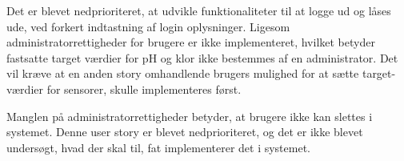 Det er blevet nedprioriteret, at udvikle funktionaliteter til at logge ud og låses ude, ved forkert indtastning af login oplysninger. Ligesom administratorrettigheder for brugere er ikke implementeret, hvilket betyder fastsatte target værdier for pH og klor ikke bestemmes af en administrator. Det vil kræve at en anden story omhandlende brugers mulighed for at sætte target-værdier for sensorer, skulle implementeres først. 

Manglen på administratorrettigheder betyder, at brugere ikke kan slettes i systemet. Denne user story er blevet nedprioriteret, og det er ikke blevet undersøgt, hvad der skal til, fat implementerer det i systemet.
